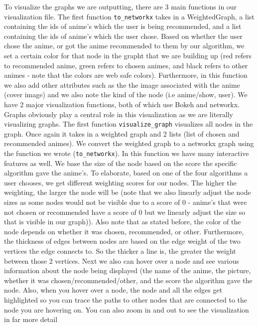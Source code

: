 \documentclass[fontsize=11pt]{article}
\begin{document}
To visualize the graphs we are outputting, there are 3 main functions in our visualization file. The first function \texttt{to\_networkx} takes in a WeightedGraph, a list containing the ids of anime's which the user is being recommended, and a list containing the ids of anime's which the user chose. Based on whether the user chose the anime, or got the anime recommended to them by our algorithm, we set a certain color for that node in the grapht that we are building up (red refers to recommended anime, green refers to chosen animes, and black refers to other animes - note that the colors are web safe colors). Furthermore, in this function we also add other attributes such as the the image associated with the anime (cover image) and we also note the kind of the node (i.e anime/show, user). We have 2 major visualization functions, both of which use Bokeh and networkx. Graphs obviously play a central role in this visualization as we are literally visualizing graphs. The first function \texttt{visualize\_graph} visualizes all nodes in the graph. Once again it takes in a weighted graph and 2 lists (list of chosen and recommended animes). We convert the weighted graph to a networkx graph using the function we wrote (\texttt{to\_networkx}). In this function we have many interactive features as well. We base the size of the node based on the score the specific algorithm gave the anime's. To elaborate, based on one of the four algorithms a user chooses, we get different weighting scores for our nodes. The higher the weighting, the larger the node will be (note that we also linearly adjust the node sizes as some nodes would not be visible due to a score of 0 - anime's that were not chosen or recommended have a score of 0 but we linearly adjust the size so that is visible in our graph)). Also note that as stated before, the color of the node depends on whether it was chosen, recommended, or other. Furthermore, the thickness of edges between nodes are based on the edge weight of the two vertices the edge connects to. So the thicker a line is, the greater the weight between those 2 vertices. Next we also can hover over a node and see various information about the node being displayed (the name of the anime, the picture, whether it was chosen/recommended/other, and the score the algorithm gave the node. Also, when you hover over a node, the node and all the edges get highlighted so you can trace the paths to other nodes that are connected to the node you are hovering on. You can also zoom in and out to see the visualization in far more detail
\end{document}
